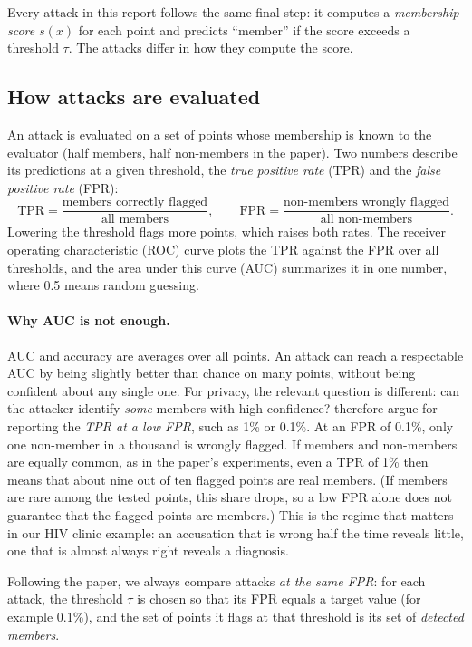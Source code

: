 \documentclass[a4paper]{article}
\begin{document}
Every attack in this report follows the same final step: it computes a \emph{membership score} $s(x)$ for each point and predicts ``member'' if the score exceeds a threshold $\tau$.
The attacks differ in how they compute the score.

\subsection{How attacks are evaluated}
\label{subsec:metrics}

An attack is evaluated on a set of points whose membership is known to the evaluator (half members, half non-members in the paper).
Two numbers describe its predictions at a given threshold, the \emph{true positive rate} (TPR) and the \emph{false positive rate} (FPR):
\[
  \text{TPR} = \frac{\text{members correctly flagged}}{\text{all members}},
  \qquad
  \text{FPR} = \frac{\text{non-members wrongly flagged}}{\text{all non-members}}.
\]
Lowering the threshold flags more points, which raises both rates.
The receiver operating characteristic (ROC) curve plots the TPR against the FPR over all thresholds, and the area under this curve (AUC) summarizes it in one number, where 0.5 means random guessing.

\paragraph{Why AUC is not enough.}
AUC and accuracy are averages over all points.
An attack can reach a respectable AUC by being slightly better than chance on many points, without being confident about any single one.
For privacy, the relevant question is different: can the attacker identify \emph{some} members with high confidence?
\citet{carlini2022membership} therefore argue for reporting the \emph{TPR at a low FPR}, such as 1\% or 0.1\%.
At an FPR of 0.1\%, only one non-member in a thousand is wrongly flagged. If members and non-members are equally common, as in the paper's experiments, even a TPR of 1\% then means that about nine out of ten flagged points are real members. (If members are rare among the tested points, this share drops, so a low FPR alone does not guarantee that the flagged points are members.)
This is the regime that matters in our HIV clinic example: an accusation that is wrong half the time reveals little, one that is almost always right reveals a diagnosis.

Following the paper, we always compare attacks \emph{at the same FPR}: for each attack, the threshold $\tau$ is chosen so that its FPR equals a target value (for example 0.1\%), and the set of points it flags at that threshold is its set of \emph{detected members}.
\end{document}
